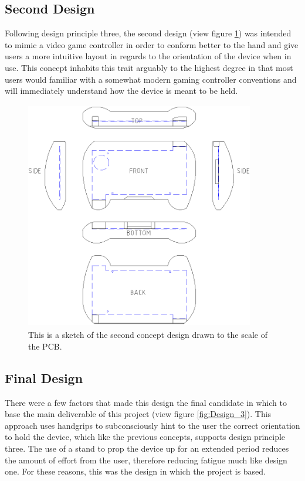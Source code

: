 \subsection{Second Design}

Following design principle three, the second design (view figure \ref{fig:Design_2}) was intended to mimic a video game controller in order to conform better to the hand and give users a more intuitive layout in regards to the orientation of the device when in use. 
This concept inhabits this trait arguably to the highest degree in that most users would familiar with a somewhat modern gaming controller conventions and will immediately understand how the device is meant to be held.

\begin{figure} [h]
\centering
\includegraphics[width=10cm,height=10cm,keepaspectratio]{Figures/design2_sketch.png}
\caption{This is a sketch of the second concept design drawn to the scale of the PCB.}
\label{fig:Design_2}
\end{figure}

\subsection{Final Design}

There were a few factors that made this design the final candidate in which to base the main deliverable of this project (view figure \ref{fig:Design_3}).
This approach uses handgrips to subconsciously hint to the user the correct orientation to hold the device, which like the previous concepts, supports design principle three.
The use of a stand to prop the device up for an extended period reduces the amount of effort from the user, therefore reducing fatigue much like design one.
For these reasons, this was the design in which the project is based.


